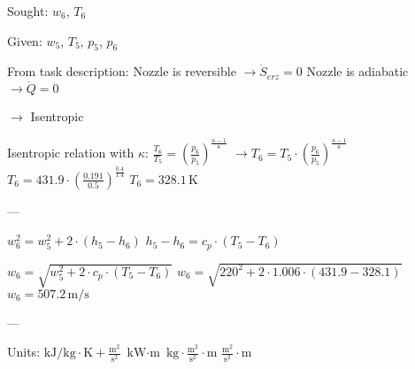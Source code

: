 Sought: \( w_6 \), \( T_6 \)  

Given: \( w_5 \), \( T_5 \), \( p_5 \), \( p_6 \)  

From task description:  
Nozzle is reversible \( \rightarrow \dot{S}_{erz} = 0 \)  
Nozzle is adiabatic \( \rightarrow \dot{Q} = 0 \)  

\( \rightarrow \) Isentropic  

Isentropic relation with \( \kappa \):  
\( \frac{T_6}{T_5} = \left( \frac{p_6}{p_5} \right)^{\frac{\kappa - 1}{\kappa}} \)  
\( \rightarrow T_6 = T_5 \cdot \left( \frac{p_6}{p_5} \right)^{\frac{\kappa - 1}{\kappa}} \)  
\( T_6 = 431.9 \cdot \left( \frac{0.191}{0.5} \right)^{\frac{0.4}{1.4}} \)  
\( T_6 = 328.1 \, \text{K} \)  

---

\( w_6^2 = w_5^2 + 2 \cdot (h_5 - h_6) \)  
\( h_5 - h_6 = c_p \cdot (T_5 - T_6) \)  

\( w_6 = \sqrt{w_5^2 + 2 \cdot c_p \cdot (T_5 - T_6)} \)  
\( w_6 = \sqrt{220^2 + 2 \cdot 1.006 \cdot (431.9 - 328.1)} \)  
\( w_6 = 507.2 \, \text{m/s} \)  

---

Units:  
\( \text{kJ/kg} \cdot \text{K} + \frac{\text{m}^2}{\text{s}^2} \)  
\( \text{kW} \cdot \text{m} \)  
\( \text{kg} \cdot \frac{\text{m}^2}{\text{s}^2} \cdot \text{m} \)  
\( \frac{\text{m}^2}{\text{s}^2} \cdot \text{m} \)